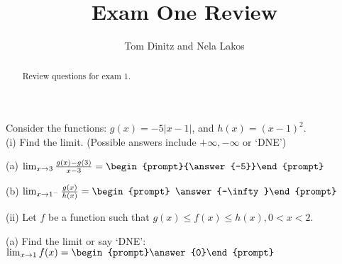 \documentclass{ximera}
\author{Tom Dinitz and Nela Lakos}
\title{Exam One Review}
\begin{document}
\begin{abstract}
Review questions for exam 1.
\end{abstract}
\maketitle
\begin{exercise}
Consider the functions: $g(x)=-5|x-1|$, and $h(x)=(x-1)^2$.\\

(i) Find the limit. (Possible answers include $+\infty, -\infty$ or `DNE')

(a) $\lim_{x\to 3} \frac{g(x)-g(3)}{x-3}=\begin{prompt}{\answer{-5}}\end{prompt}$

(b) $\lim_{x\to 1^-} \frac{g(x)}{h(x)}=\begin{prompt} \answer{-\infty}\end{prompt}$

(ii) Let $f$ be a function such that $g(x)\leq f(x)\leq h(x), 0<x<2$.

(a) Find the limit or say `DNE': $\lim_{x\to 1} f(x)= \begin{prompt}\answer{0}\end{prompt}$
\end{exercise}
\end{document}
